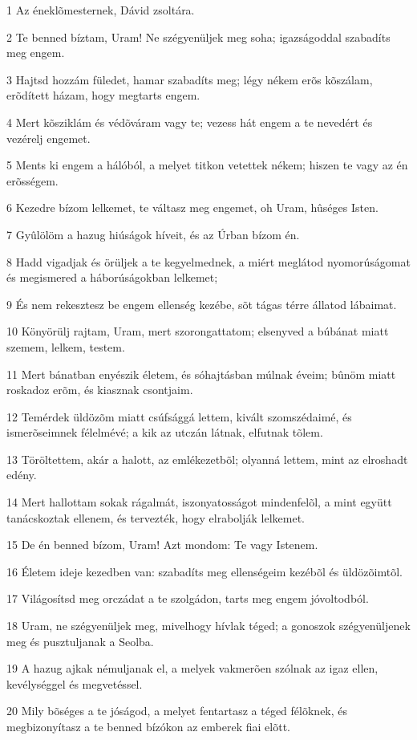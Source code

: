 \par 1 Az éneklõmesternek, Dávid zsoltára.
\par 2 Te benned bíztam, Uram! Ne szégyenüljek meg soha; igazságoddal szabadíts meg engem.
\par 3 Hajtsd hozzám füledet, hamar szabadíts meg; légy nékem erõs kõszálam, erõdített házam, hogy megtarts engem.
\par 4 Mert kõsziklám és védõváram vagy te; vezess hát engem a te nevedért és vezérelj engemet.
\par 5 Ments ki engem a hálóból, a melyet titkon vetettek nékem; hiszen te vagy az én erõsségem.
\par 6 Kezedre bízom lelkemet, te váltasz meg engemet, oh Uram, hûséges Isten.
\par 7 Gyûlölöm a hazug hiúságok híveit, és az Úrban bízom én.
\par 8 Hadd vigadjak és örüljek a te kegyelmednek, a miért meglátod nyomorúságomat és megismered a háborúságokban lelkemet;
\par 9 És nem rekesztesz be engem ellenség kezébe, sõt tágas térre állatod lábaimat.
\par 10 Könyörülj rajtam, Uram, mert szorongattatom; elsenyved a búbánat miatt szemem, lelkem, testem.
\par 11 Mert bánatban enyészik életem, és sóhajtásban múlnak éveim; bûnöm miatt roskadoz erõm, és kiasznak csontjaim.
\par 12 Temérdek üldözõm miatt csúfsággá lettem, kivált szomszédaimé, és ismerõseimnek félelmévé; a kik az utczán látnak, elfutnak tõlem.
\par 13 Töröltettem, akár a halott, az emlékezetbõl; olyanná lettem, mint az elroshadt edény.
\par 14 Mert hallottam sokak rágalmát, iszonyatosságot mindenfelõl, a mint együtt tanácskoztak ellenem, és tervezték, hogy elrabolják lelkemet.
\par 15 De én benned bízom, Uram! Azt mondom: Te vagy Istenem.
\par 16 Életem ideje kezedben van: szabadíts meg ellenségeim kezébõl és üldözõimtõl.
\par 17 Világosítsd meg orczádat a te szolgádon, tarts meg engem jóvoltodból.
\par 18 Uram, ne szégyenüljek meg, mivelhogy hívlak téged; a gonoszok szégyenüljenek meg és pusztuljanak a Seolba.
\par 19 A hazug ajkak némuljanak el, a melyek vakmerõen szólnak az igaz ellen, kevélységgel és megvetéssel.
\par 20 Mily bõséges a te jóságod, a melyet fentartasz a téged félõknek, és megbizonyítasz a te benned bízókon az emberek fiai elõtt.
